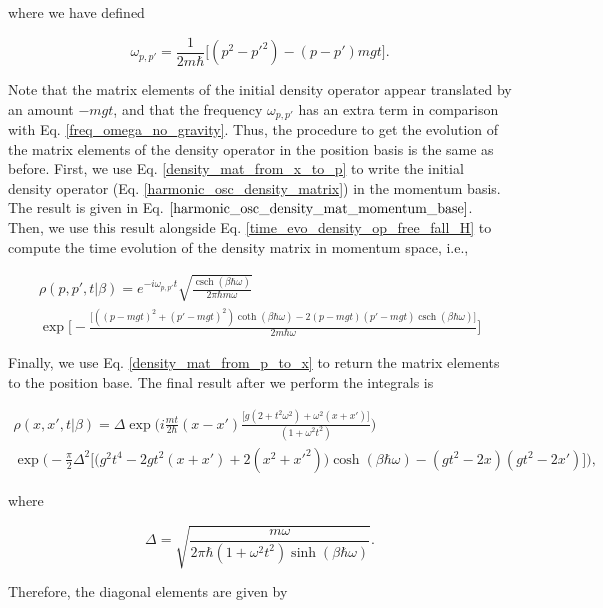 \documentclass{article}
\DeclareMathOperator{\csch}{csch}
\begin{document}
where we have defined

\begin{equation}
    \omega_{p,p'} = \frac{1}{2m\hbar} \big[ (p^{2}-p'^{2})-(p-p')mgt \big].
\end{equation}

Note that the matrix elements of the initial density operator appear translated by an amount $-mgt$, and that the frequency $\omega_{p,p'}$ has an extra term in comparison with Eq. \ref{freq_omega_no_gravity}. Thus, the procedure to get the evolution of the matrix elements of the density operator in the position basis is the same as before. First, we use Eq. \ref{density_mat_from_x_to_p} to write the initial density operator (Eq. \ref{harmonic_osc_density_matrix}) in the momentum basis. The result is given in Eq. $\ref{harmonic_osc_density_mat_momentum_base}$. Then, we use this result alongside Eq. \ref{time_evo_density_op_free_fall_H} to compute the time evolution of the density matrix in momentum space, i.e.,

\begin{multline}
    \rho(p,p',t|\beta) = e^{-i\omega_{p,p'} t} \sqrt{\frac{\csch(\beta \hbar \omega)}{2\pi \hbar m \omega}} \\ 
    \exp \bigg[ -\frac{\big[ ((p-mgt)^{2}+(p'-mgt)^{2})\coth(\beta \hbar \omega) - 2(p-mgt)(p'-mgt)\csch(\beta \hbar \omega) \big]}{2m\hbar \omega} \bigg]
\end{multline}

Finally, we use Eq. \ref{density_mat_from_p_to_x} to return the matrix elements to the position base. The final result after we perform the integrals is

\begin{multline}
    \rho(x,x',t|\beta) = \Delta \exp \bigg(i \frac{mt}{2\hbar} (x-x') \frac{\big[g(2+t^{2}\omega^{2})+\omega^{2}(x+x')\big]}{(1+ \omega^{2}t^{2})} \bigg) \\
    \exp \bigg( -\frac{\pi}{2} \Delta^{2} \Big[ \big( g^{2} t^{4} - 2g t^{2}(x+x') + 2(x^{2}+x'^{2}) \big)\cosh(\beta \hbar \omega) - (g t^{2} - 2x)(g t^{2} - 2x') \Big] \bigg),
\end{multline}

where

\begin{equation}
    \Delta = \sqrt{\frac{m\omega}{2\pi \hbar (1+ \omega^{2}t^{2}) \sinh (\beta \hbar \omega)}}.
\end{equation}

Therefore, the diagonal elements are given by
\end{document}
